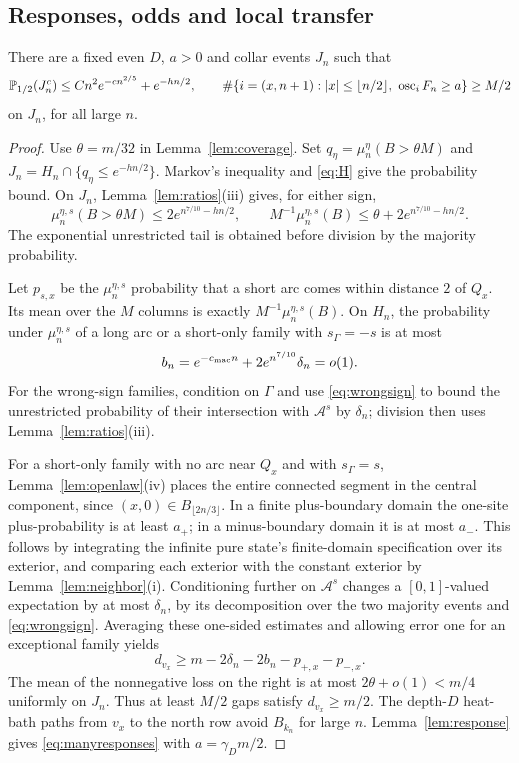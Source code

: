 \subsection{Responses, odds and local transfer}
\begin{lemma}\label{lem:manyresponses}
There are a fixed even $D$, $a>0$ and collar events $J_n$ such that
\begin{equation}\label{eq:manyresponses}
 \mathbb P_{1/2}(J_n^c)\le Cn^2e^{-c n^{2/5}}+e^{-hn/2},\qquad
 \#\{i=(x,n+1):|x|\le\lfloor n/2\rfloor,\ \operatorname{osc}_iF_n\ge a\}\ge M/2
\end{equation}
on $J_n$, for all large $n$.
\end{lemma}
\begin{proof}
Use $\theta=m/32$ in Lemma~\ref{lem:coverage}. Set $q_\eta=\mu_n^\eta(B>\theta M)$ and $J_n=H_n\cap\{q_\eta\le e^{-hn/2}\}$. Markov's inequality and \eqref{eq:H} give the probability bound. On $J_n$, Lemma~\ref{lem:ratios}(iii) gives, for either sign,
\[
 \mu_n^{\eta,s}(B>\theta M)\le2e^{n^{7/10}-hn/2},\qquad
 M^{-1}\mu_n^{\eta,s}(B)\le\theta+2e^{n^{7/10}-hn/2}.
\]
The exponential unrestricted tail is obtained before division by the majority probability.

Let $p_{s,x}$ be the $\mu_n^{\eta,s}$ probability that a short arc comes within distance $2$ of $Q_x$. Its mean over the $M$ columns is exactly $M^{-1}\mu_n^{\eta,s}(B)$. On $H_n$, the probability under $\mu_n^{\eta,s}$ of a long arc or a short-only family with $s_\Gamma=-s$ is at most
\[
 b_n=e^{-c_{\rm mac}n}+2e^{n^{7/10}}\delta_n=o(1).
\]
For the wrong-sign families, condition on $\Gamma$ and use \eqref{eq:wrongsign} to bound the unrestricted probability of their intersection with $\mathcal A^s$ by $\delta_n$; division then uses Lemma~\ref{lem:ratios}(iii).

For a short-only family with no arc near $Q_x$ and with $s_\Gamma=s$, Lemma~\ref{lem:openlaw}(iv) places the entire connected segment in the central component, since $(x,0)\in B_{\lfloor2n/3\rfloor}$. In a finite plus-boundary domain the one-site plus-probability is at least $a_+$; in a minus-boundary domain it is at most $a_-$. This follows by integrating the infinite pure state's finite-domain specification over its exterior, and comparing each exterior with the constant exterior by Lemma~\ref{lem:neighbor}(i). Conditioning further on $\mathcal A^s$ changes a $[0,1]$-valued expectation by at most $\delta_n$, by its decomposition over the two majority events and \eqref{eq:wrongsign}. Averaging these one-sided estimates and allowing error one for an exceptional family yields
\begin{equation}\label{eq:responseloss}
 d_{v_x}\ge m-2\delta_n-2b_n-p_{+,x}-p_{-,x}.
\end{equation}
The mean of the nonnegative loss on the right is at most $2\theta+o(1)<m/4$ uniformly on $J_n$. Thus at least $M/2$ gaps satisfy $d_{v_x}\ge m/2$. The depth-$D$ heat-bath paths from $v_x$ to the north row avoid $B_{k_n}$ for large $n$. Lemma~\ref{lem:response} gives \eqref{eq:manyresponses} with $a=\gamma_Dm/2$.


\end{proof}
